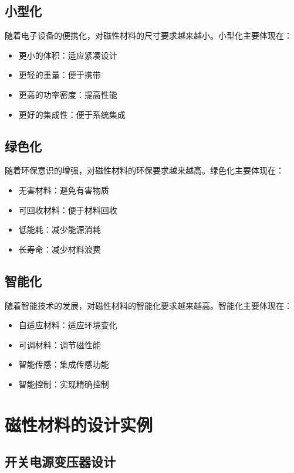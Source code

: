 \documentclass[12pt,UTF8]{ctexbook}
\begin{document}
\section{小型化}

随着电子设备的便携化，对磁性材料的尺寸要求越来越小。小型化主要体现在：

\begin{itemize}[leftmargin=2cm]
    \item 更小的体积：适应紧凑设计
    \item 更轻的重量：便于携带
    \item 更高的功率密度：提高性能
    \item 更好的集成性：便于系统集成
\end{itemize}

\section{绿色化}

随着环保意识的增强，对磁性材料的环保要求越来越高。绿色化主要体现在：

\begin{itemize}[leftmargin=2cm]
    \item 无害材料：避免有害物质
    \item 可回收材料：便于材料回收
    \item 低能耗：减少能源消耗
    \item 长寿命：减少材料浪费
\end{itemize}

\section{智能化}

随着智能技术的发展，对磁性材料的智能化要求越来越高。智能化主要体现在：

\begin{itemize}[leftmargin=2cm]
    \item 自适应材料：适应环境变化
    \item 可调材料：调节磁性能
    \item 智能传感：集成传感功能
    \item 智能控制：实现精确控制
\end{itemize}

\chapter{磁性材料的设计实例}

\section{开关电源变压器设计}
\end{document}
